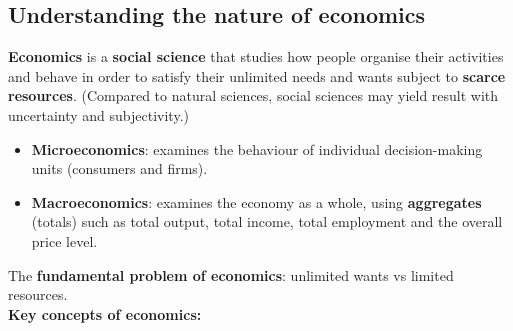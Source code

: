 \subsection{Understanding the nature of economics}
\textbf{Economics} is a \textbf{social science} that studies how people organise their activities and behave in order to satisfy their unlimited needs and wants subject to \textbf{scarce resources}. (Compared to natural sciences, social sciences may yield result with uncertainty and subjectivity.)
\begin{itemize}
  \item \textbf{Microeconomics}: examines the behaviour of individual decision-making units (consumers and firms).
  \item \textbf{Macroeconomics}: examines the economy as a whole, using \textbf{aggregates} (totals) such as total output, total income, total employment and the overall price level.
\end{itemize}
The \textbf{fundamental problem of economics}: unlimited wants vs limited resources.\\ 
\textbf{Key concepts of economics:}

